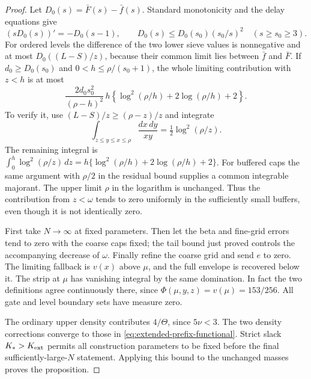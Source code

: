 \documentclass[11pt]{article}
\begin{document}
\begin{proof}
Let $D_0(s)=\bar F(s)-\bar f(s)$. Standard monotonicity and
the delay equations give
\[
 (sD_0(s))'=-D_0(s-1),\qquad
 D_0(s)\le D_0(s_0)(s_0/s)^2\quad(s\ge s_0\ge3).
\]
For ordered levels the difference of the two lower sieve values
is nonnegative and at most $D_0((L-S)/z)$, because their common
limit lies between $\bar f$ and $\bar F$.
If $d_0\ge D_0(s_0)$ and $0<h\le\rho/(s_0+1)$, the whole
limiting contribution with $z<h$ is at most
\begin{equation}\label{eq:extended-prefix-tail-bound}
 \frac{2d_0s_0^2}{(\rho-h)^2}\,h
 \left\{\log^2(\rho/h)+2\log(\rho/h)+2\right\}.
\end{equation}
To verify it, use $(L-S)/z\ge(\rho-z)/z$ and integrate
\[
 \int_{z\le y\le x\le\rho}\frac{dx\,dy}{xy}
                       =\tfrac12\log^2(\rho/z).
\]
The remaining integral is
$\int_0^h\log^2(\rho/z)\,dz
=h\{\log^2(\rho/h)+2\log(\rho/h)+2\}$.
For buffered caps the same argument with $\rho/2$ in the
residual bound supplies a common integrable majorant. The upper
limit $\rho$ in the logarithm is unchanged. Thus the contribution
from $z<\omega$ tends to zero uniformly in the sufficiently small
buffers, even though it is not identically zero.

First take $N\to\infty$ at fixed parameters. Then let the beta
and fine-grid errors tend to zero with the coarse caps fixed;
the tail bound just proved controls the accompanying decrease
of $\omega$. Finally refine the coarse grid and send $e$ to zero.
The limiting fallback is $v(x)$ above $\mu$, and the full envelope
is recovered below it. The strip at $\mu$ has vanishing integral
by the same domination. In fact the two definitions agree
continuously there, since $\Phi(\mu,y,z)=v(\mu)=153/256$.
All gate and level boundary sets have measure zero.

The ordinary upper density contributes $4/\Theta$, since
$5\nu<3$. The two density corrections converge to those in
\eqref{eq:extended-prefix-functional}. Strict slack
$K_*>K_{\rm ext}$ permits all construction parameters to be
fixed before the final sufficiently-large-$N$ statement. Applying
this bound to the unchanged masses proves the proposition.
\end{proof}
\end{document}
